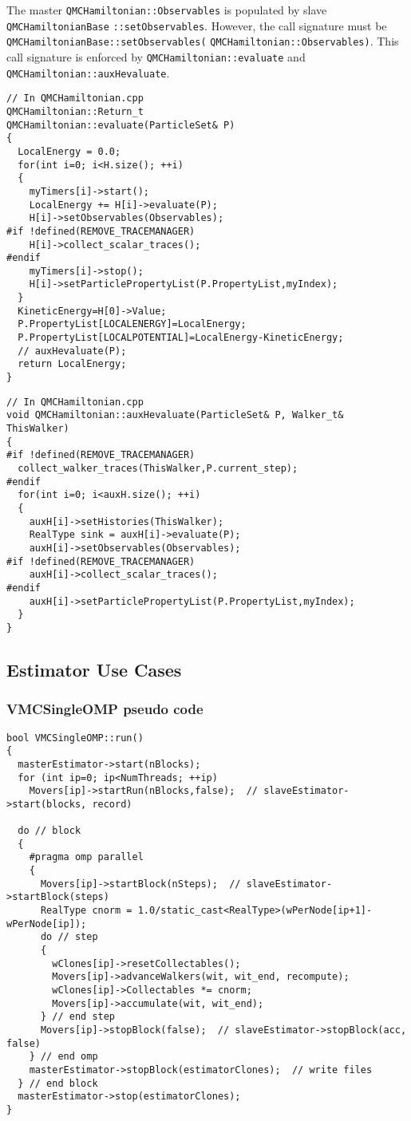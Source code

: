 The master \verb|QMCHamiltonian::Observables| is populated by slave \verb|QMCHamiltonianBase|
\verb|::setObservables|. However, the call signature must be \verb|QMCHamiltonianBase::setObservables(|
\verb|QMCHamiltonian::Observables)|. This call signature is enforced by \verb|QMCHamiltonian::evaluate| and \verb|QMCHamiltonian::auxHevaluate|.

\begin{lstlisting}
// In QMCHamiltonian.cpp
QMCHamiltonian::Return_t
QMCHamiltonian::evaluate(ParticleSet& P)
{
  LocalEnergy = 0.0;
  for(int i=0; i<H.size(); ++i)
  {
    myTimers[i]->start();
    LocalEnergy += H[i]->evaluate(P);
    H[i]->setObservables(Observables);
#if !defined(REMOVE_TRACEMANAGER)
    H[i]->collect_scalar_traces();
#endif
    myTimers[i]->stop();
    H[i]->setParticlePropertyList(P.PropertyList,myIndex);
  }
  KineticEnergy=H[0]->Value;
  P.PropertyList[LOCALENERGY]=LocalEnergy;
  P.PropertyList[LOCALPOTENTIAL]=LocalEnergy-KineticEnergy;
  // auxHevaluate(P);
  return LocalEnergy;
}
\end{lstlisting}

\begin{lstlisting}
// In QMCHamiltonian.cpp
void QMCHamiltonian::auxHevaluate(ParticleSet& P, Walker_t& ThisWalker)
{
#if !defined(REMOVE_TRACEMANAGER)
  collect_walker_traces(ThisWalker,P.current_step);
#endif
  for(int i=0; i<auxH.size(); ++i)
  {
    auxH[i]->setHistories(ThisWalker);
    RealType sink = auxH[i]->evaluate(P);
    auxH[i]->setObservables(Observables);
#if !defined(REMOVE_TRACEMANAGER)
    auxH[i]->collect_scalar_traces();
#endif
    auxH[i]->setParticlePropertyList(P.PropertyList,myIndex);
  }
}
\end{lstlisting}

\subsection{Estimator Use Cases}

\subsubsection{VMCSingleOMP pseudo code}
\begin{lstlisting}
bool VMCSingleOMP::run()
{
  masterEstimator->start(nBlocks);
  for (int ip=0; ip<NumThreads; ++ip)
    Movers[ip]->startRun(nBlocks,false);  // slaveEstimator->start(blocks, record)
  
  do // block
  {
    #pragma omp parallel
    {
      Movers[ip]->startBlock(nSteps);  // slaveEstimator->startBlock(steps)
      RealType cnorm = 1.0/static_cast<RealType>(wPerNode[ip+1]-wPerNode[ip]);
      do // step
      {
        wClones[ip]->resetCollectables();
        Movers[ip]->advanceWalkers(wit, wit_end, recompute);
        wClones[ip]->Collectables *= cnorm;
        Movers[ip]->accumulate(wit, wit_end);
      } // end step
      Movers[ip]->stopBlock(false);  // slaveEstimator->stopBlock(acc, false)
    } // end omp
    masterEstimator->stopBlock(estimatorClones);  // write files
  } // end block
  masterEstimator->stop(estimatorClones);
}
\end{lstlisting}


